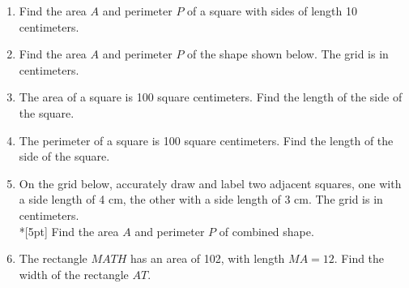 \begin{enumerate}
\item Find the area $A$ and perimeter $P$ of a square with sides of length 10 centimeters. \vspace{4cm}
    
  \item Find the area $A$ and perimeter $P$ of the shape shown below. The grid is in centimeters.
      \begin{flushleft}
      \end{flushleft}
        
  \item The area of a square is 100 square centimeters. Find the length of the side of the square. \vspace{3cm}
      
  \item The perimeter of a square is 100 square centimeters. Find the length of the side of the square.
  
\newpage
\item On the grid below, accurately draw and label two adjacent squares, one with a side length of 4 cm, the other with a side length of 3 cm. The grid is in centimeters.\\*[5pt]
  Find the area $A$ and perimeter $P$ of combined shape.
  \begin{flushleft}
  \end{flushleft}

\item The rectangle $MATH$ has an area of 102, with length $MA=12$. Find the width of the rectangle $AT$.
\begin{flushleft}
\end{flushleft} \vspace{1cm} 


\end{enumerate}
